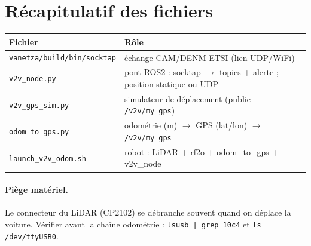 \documentclass[a4paper,11pt]{article}
\begin{document}
\section{Récapitulatif des fichiers}
\begin{center}
\begin{tabularx}{\textwidth}{@{}l X@{}}
\toprule
\textbf{Fichier} & \textbf{Rôle} \\
\midrule
\texttt{vanetza/build/bin/socktap} & échange CAM/DENM ETSI (lien UDP/WiFi) \\
\texttt{v2v\_node.py}              & pont ROS2 : socktap $\rightarrow$ topics + alerte ; position statique ou UDP \\
\texttt{v2v\_gps\_sim.py}          & simulateur de déplacement (publie \texttt{/v2v/my\_gps}) \\
\texttt{odom\_to\_gps.py}          & odométrie (m) $\rightarrow$ GPS (lat/lon) $\rightarrow$ \texttt{/v2v/my\_gps} \\
\texttt{launch\_v2v\_odom.sh}      & robot : LiDAR + rf2o + odom\_to\_gps + v2v\_node \\
\bottomrule
\end{tabularx}
\end{center}

\paragraph{Piège matériel.} Le connecteur du LiDAR (CP2102) se débranche souvent
quand on déplace la voiture. Vérifier avant la chaîne odométrie :
\texttt{lsusb | grep 10c4} et \texttt{ls /dev/ttyUSB0}.
\end{document}

